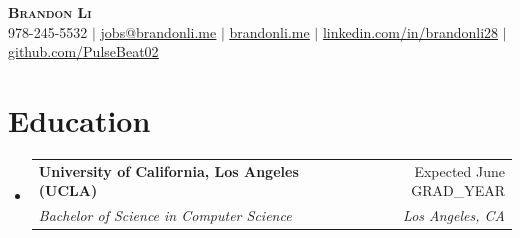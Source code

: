\documentclass[letterpaper,11pt]{article}
\makeatletter
\let\oldhref\href
\renewcommand{\href}[2]{\oldhref{#1}{\uline{#2}}}
\newcommand{\resumeSubheading}[4]{
    \vspace{-2pt}\item
    \begin{tabular*}{0.97\textwidth}[t]{l@{\extracolsep{\fill}}r}
    \textbf{#1} & #2 \\
    \textit{\small#3} & \textit{\small #4} \\
    \end{tabular*}\vspace{-7pt}
}
\newcommand{\resumeSubHeadingListStart}{\begin{itemize}[leftmargin=0.15in, label={}]}
\newcommand{\resumeSubHeadingListEnd}{\end{itemize}}
\makeatother
\begin{document}

    \begin{center}
        \textbf{\Huge \scshape Brandon Li} \\ \vspace{1pt}
        \small 978-245-5532 $|$
        \href{mailto:jobs@brandonli.me}{jobs@brandonli.me} $|$
        \href{https://brandonli.me}{brandonli.me} $|$
        \href{https://linkedin.com/in/brandonli28}{linkedin.com/in/brandonli28} $|$
        \href{https://github.com/PulseBeat02}{github.com/PulseBeat02}
    \end{center}


    \section{Education}
    \resumeSubHeadingListStart
    \resumeSubheading
    {University of California, Los Angeles (UCLA)}{Expected June {{GRAD_YEAR}}}
    {Bachelor of Science in Computer Science}{Los Angeles, CA}
    \vspace{2mm}
    \resumeSubHeadingListEnd


\end{document}
